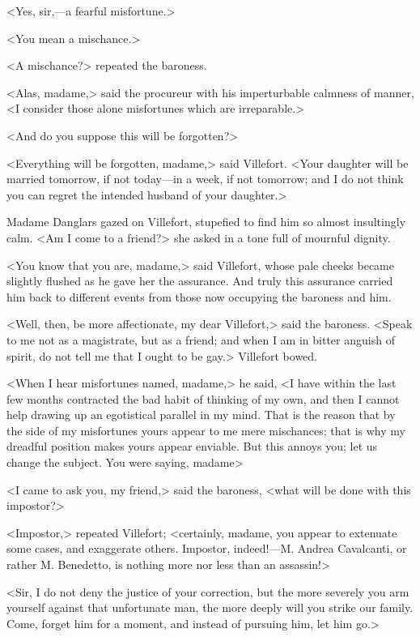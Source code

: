  <Yes, sir,—a fearful misfortune.> 

 <You mean a mischance.> 

 <A mischance?> repeated the baroness. 

 <Alas, madame,> said the procureur with his imperturbable calmness of manner, <I consider those alone misfortunes which are irreparable.> 

 <And do you suppose this will be forgotten?> 

 <Everything will be forgotten, madame,> said Villefort. <Your daughter will be married tomorrow, if not today—in a week, if not tomorrow; and I do not think you can regret the intended husband of your daughter.> 

 Madame Danglars gazed on Villefort, stupefied to find him so almost insultingly calm. <Am I come to a friend?> she asked in a tone full of mournful dignity. 

 <You know that you are, madame,> said Villefort, whose pale cheeks became slightly flushed as he gave her the assurance. And truly this assurance carried him back to different events from those now occupying the baroness and him. 

 <Well, then, be more affectionate, my dear Villefort,> said the baroness. <Speak to me not as a magistrate, but as a friend; and when I am in bitter anguish of spirit, do not tell me that I ought to be gay.> Villefort bowed. 

 <When I hear misfortunes named, madame,> he said, <I have within the last few months contracted the bad habit of thinking of my own, and then I cannot help drawing up an egotistical parallel in my mind. That is the reason that by the side of my misfortunes yours appear to me mere mischances; that is why my dreadful position makes yours appear enviable. But this annoys you; let us change the subject. You were saying, madame\longdash> 

 <I came to ask you, my friend,> said the baroness, <what will be done with this impostor?> 

 <Impostor,> repeated Villefort; <certainly, madame, you appear to extenuate some cases, and exaggerate others. Impostor, indeed!—M. Andrea Cavalcanti, or rather M. Benedetto, is nothing more nor less than an assassin!> 

 <Sir, I do not deny the justice of your correction, but the more severely you arm yourself against that unfortunate man, the more deeply will you strike our family. Come, forget him for a moment, and instead of pursuing him, let him go.> 

